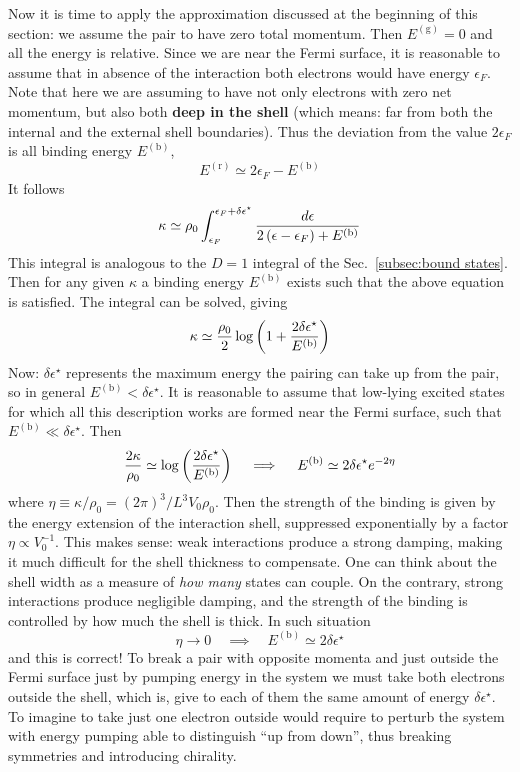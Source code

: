 Now it is time to apply the approximation discussed at the beginning of this section: we assume the pair to have zero total momentum. Then $E^{(\mathrm{g})}=0$ and all the energy is relative. Since we are near the Fermi surface, it is reasonable to assume that in absence of the interaction both electrons would have energy $\epsilon_F$. Note that here we are assuming to have not only electrons with zero net momentum, but also both \textbf{deep in the shell} (which means: far from both the internal and the external shell boundaries). Thus the deviation from the value $2\epsilon_F$ is all binding energy $E^{(\mathrm{b})}$,
\[
	E^{(\mathrm{r})} \simeq 2 \epsilon_F - E^{(\mathrm{b})}
\]
It follows
\[
	\kappa \simeq \rho_0 \int_{\epsilon_F}^{\epsilon_F+\delta\epsilon^\star} \frac{d\epsilon}{2\left({\epsilon-\epsilon_F}\right) + E^{(\mathrm{b})}}
\]
This integral is analogous to the $D=1$ integral of the Sec.~\ref{subsec:bound states}. Then for any given $\kappa$ a binding energy $E^{(\mathrm{b})}$ exists such that the above equation is satisfied. The integral can be solved, giving
\[
	\kappa \simeq \frac{\rho_0}{2} \log \left({1+ \frac{2\delta\epsilon^\star}{E^{(\mathrm{b})}}}\right)
\]
Now: $\delta\epsilon^\star$ represents the maximum energy the pairing can take up from the pair, so in general $E^{(\mathrm{b})} < \delta\epsilon^\star$. It is reasonable to assume that low-lying excited states for which all this description works are formed near the Fermi surface, such that $E^{(\mathrm{b})} \ll \delta\epsilon^\star$. Then
\[
	\frac{2\kappa}{\rho_0} \simeq \log \left({\frac{2\delta\epsilon^\star}{E^{(\mathrm{b})}}}\right)
	\quad\implies\quad
	E^{(\mathrm{b})} \simeq 2\delta\epsilon^\star e^{-2\eta}
\]
where $\eta \equiv \kappa/\rho_0 = (2\pi)^3 / L^3 V_0 \rho_0$. Then the strength of the binding is given by the energy extension of the interaction shell, suppressed exponentially by a factor $\eta \propto V_0^{-1}$. This makes sense: weak interactions produce a strong damping, making it much difficult for the shell thickness to compensate. One can think about the shell width as a measure of \textit{how many} states can couple. On the contrary, strong interactions produce negligible damping, and the strength of the binding is controlled by how much the shell is thick.
In such situation
\[
	\eta\to 0
	\quad\implies\quad
	E^{(\mathrm{b})} \simeq 2\delta\epsilon^\star
\]
and this is correct! To break a pair with opposite momenta and just outside the Fermi surface just by pumping energy in the system we must take both electrons outside the shell, which is, give to each of them the same amount of energy $\delta\epsilon^\star$. To imagine to take just one electron outside would require to perturb the system with energy pumping able to distinguish ``up from down'', thus breaking symmetries and introducing chirality.

